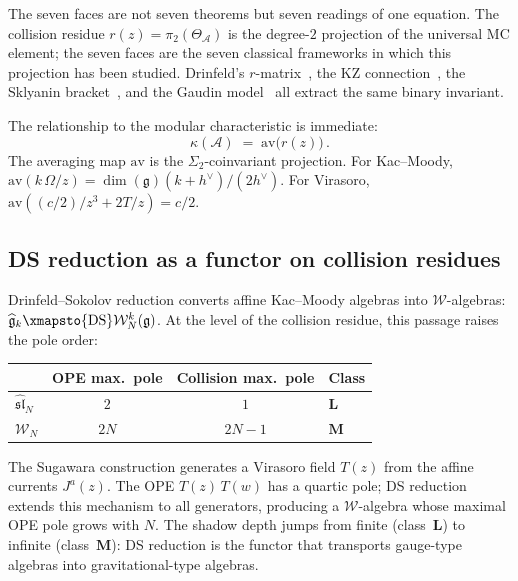 \documentclass[11pt,reqno]{amsart}
\theoremstyle{definition}
\theoremstyle{remark}
\newcommand{\cA}{\mathcal{A}}
\newcommand{\fg}{\mathfrak{g}}
\numberwithin{equation}{section}
\begin{document}
The seven faces are not seven theorems but seven readings of
one equation. The collision residue
$r(z) = \pi_2(\Theta_\cA)$ is the degree-$2$ projection of
the universal MC element; the seven faces are the seven
classical frameworks in which this projection has been
studied. Drinfeld's $r$-matrix~\cite{Drinfeld85}, the KZ
connection~\cite{KZ84}, the Sklyanin
bracket~\cite{STS83}, and the Gaudin model~\cite{FFR94}
all extract the same binary invariant.

The relationship to the modular characteristic is immediate:
\begin{equation}\label{eq:kappa-from-r}
\kappa(\cA)
\;=\;
\mathrm{av}\bigl(r(z)\bigr)\,.
\end{equation}
The averaging map $\mathrm{av}$ is the
$\Sigma_2$-coinvariant projection. For Kac--Moody,
$\mathrm{av}(k\,\Omega/z) = \dim(\fg)(k + h^\vee)/(2h^\vee)$.
For Virasoro, $\mathrm{av}((c/2)/z^3 + 2T/z) = c/2$.

\subsection{DS reduction as a functor on collision residues}
\label{ssec:ds-reduction}

Drinfeld--Sokolov reduction converts affine Kac--Moody
algebras into $\mathcal{W}$-algebras:
$\widehat{\fg}_k \xmapsto{\mathrm{DS}}
\mathcal{W}_N^k(\fg)$. At the level of the collision
residue, this passage raises the pole order:

\begin{center}
\renewcommand{\arraystretch}{1.2}
\begin{tabular}{lccl}
\toprule
& \textbf{OPE max.\ pole} & \textbf{Collision max.\ pole}
 & \textbf{Class} \\
\midrule
$\widehat{\mathfrak{sl}}_N$ & $2$ & $1$ & $\mathbf{L}$ \\
$\mathcal{W}_N$ & $2N$ & $2N{-}1$ & $\mathbf{M}$ \\
\bottomrule
\end{tabular}
\end{center}

\noindent
The Sugawara construction generates a Virasoro field
$T(z)$ from the affine currents $J^a(z)$. The OPE
$T(z)\,T(w)$ has a quartic pole; DS reduction extends
this mechanism to all generators, producing a
$\mathcal{W}$-algebra whose maximal OPE pole grows with
$N$. The shadow depth jumps from finite (class~$\mathbf{L}$)
to infinite (class~$\mathbf{M}$): DS reduction is the functor
that transports gauge-type algebras into gravitational-type
algebras.
\end{document}
